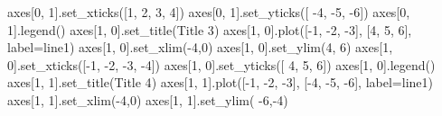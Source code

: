 \documentclass[
  letterpaper,
  DIV=11,
  numbers=noendperiod]{scrreprt}
\newenvironment{Shaded}{\begin{snugshade}}{\end{snugshade}}
\newcommand{\DecValTok}[1]{\textcolor[rgb]{0.68,0.00,0.00}{#1}}
\newcommand{\NormalTok}[1]{\textcolor[rgb]{0.00,0.23,0.31}{#1}}
\newcommand{\OperatorTok}[1]{\textcolor[rgb]{0.37,0.37,0.37}{#1}}
\newcommand{\StringTok}[1]{\textcolor[rgb]{0.13,0.47,0.30}{#1}}
\begin{document}
\begin{Shaded}
\begin{Highlighting}[]
\NormalTok{axes[}\DecValTok{0}\NormalTok{, }\DecValTok{1}\NormalTok{].set\_xticks([}\DecValTok{1}\NormalTok{, }\DecValTok{2}\NormalTok{, }\DecValTok{3}\NormalTok{, }\DecValTok{4}\NormalTok{])}
\NormalTok{axes[}\DecValTok{0}\NormalTok{, }\DecValTok{1}\NormalTok{].set\_yticks([ }\OperatorTok{{-}}\DecValTok{4}\NormalTok{, }\OperatorTok{{-}}\DecValTok{5}\NormalTok{, }\OperatorTok{{-}}\DecValTok{6}\NormalTok{])}
\NormalTok{axes[}\DecValTok{0}\NormalTok{, }\DecValTok{1}\NormalTok{].legend()}
\NormalTok{axes[}\DecValTok{1}\NormalTok{, }\DecValTok{0}\NormalTok{].set\_title(}\StringTok{\textquotesingle{}Title 3\textquotesingle{}}\NormalTok{)}
\NormalTok{axes[}\DecValTok{1}\NormalTok{, }\DecValTok{0}\NormalTok{].plot([}\OperatorTok{{-}}\DecValTok{1}\NormalTok{, }\OperatorTok{{-}}\DecValTok{2}\NormalTok{, }\OperatorTok{{-}}\DecValTok{3}\NormalTok{], [}\DecValTok{4}\NormalTok{, }\DecValTok{5}\NormalTok{, }\DecValTok{6}\NormalTok{], label}\OperatorTok{=}\StringTok{\textquotesingle{}line1\textquotesingle{}}\NormalTok{)}
\NormalTok{axes[}\DecValTok{1}\NormalTok{, }\DecValTok{0}\NormalTok{].set\_xlim(}\OperatorTok{{-}}\DecValTok{4}\NormalTok{,}\DecValTok{0}\NormalTok{)}
\NormalTok{axes[}\DecValTok{1}\NormalTok{, }\DecValTok{0}\NormalTok{].set\_ylim(}\DecValTok{4}\NormalTok{, }\DecValTok{6}\NormalTok{)}
\NormalTok{axes[}\DecValTok{1}\NormalTok{, }\DecValTok{0}\NormalTok{].set\_xticks([}\OperatorTok{{-}}\DecValTok{1}\NormalTok{, }\OperatorTok{{-}}\DecValTok{2}\NormalTok{, }\OperatorTok{{-}}\DecValTok{3}\NormalTok{, }\OperatorTok{{-}}\DecValTok{4}\NormalTok{])}
\NormalTok{axes[}\DecValTok{1}\NormalTok{, }\DecValTok{0}\NormalTok{].set\_yticks([ }\DecValTok{4}\NormalTok{, }\DecValTok{5}\NormalTok{, }\DecValTok{6}\NormalTok{])}
\NormalTok{axes[}\DecValTok{1}\NormalTok{, }\DecValTok{0}\NormalTok{].legend()}
\NormalTok{axes[}\DecValTok{1}\NormalTok{, }\DecValTok{1}\NormalTok{].set\_title(}\StringTok{\textquotesingle{}Title 4\textquotesingle{}}\NormalTok{)}
\NormalTok{axes[}\DecValTok{1}\NormalTok{, }\DecValTok{1}\NormalTok{].plot([}\OperatorTok{{-}}\DecValTok{1}\NormalTok{, }\OperatorTok{{-}}\DecValTok{2}\NormalTok{, }\OperatorTok{{-}}\DecValTok{3}\NormalTok{], [}\OperatorTok{{-}}\DecValTok{4}\NormalTok{, }\OperatorTok{{-}}\DecValTok{5}\NormalTok{, }\OperatorTok{{-}}\DecValTok{6}\NormalTok{], label}\OperatorTok{=}\StringTok{\textquotesingle{}line1\textquotesingle{}}\NormalTok{)}
\NormalTok{axes[}\DecValTok{1}\NormalTok{, }\DecValTok{1}\NormalTok{].set\_xlim(}\OperatorTok{{-}}\DecValTok{4}\NormalTok{,}\DecValTok{0}\NormalTok{)}
\NormalTok{axes[}\DecValTok{1}\NormalTok{, }\DecValTok{1}\NormalTok{].set\_ylim( }\OperatorTok{{-}}\DecValTok{6}\NormalTok{,}\OperatorTok{{-}}\DecValTok{4}\NormalTok{)}

\end{Highlighting}
\end{Shaded}
\end{document}
